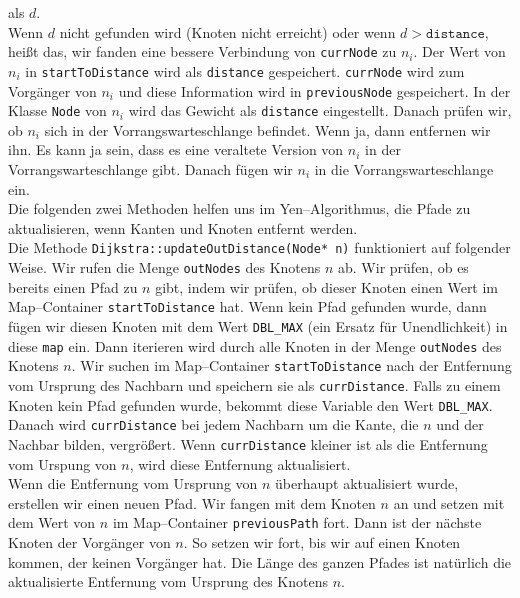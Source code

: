 \documentclass[a4paper,10pt,ngerman]{scrartcl}
\begin{document}
als $d$.\\
Wenn $d$ nicht gefunden wird (Knoten nicht erreicht) oder wenn $d > \texttt{distance}$, heißt das,
wir fanden eine bessere Verbindung von \texttt{currNode} zu $n_i$. Der Wert von $n_i$ in \texttt{startToDistance}
wird als \texttt{distance} gespeichert. \texttt{currNode} wird zum Vorgänger von $n_i$ und diese Information wird in
\texttt{previousNode} gespeichert. In der Klasse \texttt{Node} von $n_i$ wird das Gewicht als \texttt{distance} eingestellt.
Danach prüfen wir, ob $n_i$ sich in der Vorrangswarteschlange befindet. Wenn ja, dann entfernen wir ihn. Es kann ja sein,
dass es eine veraltete Version von $n_i$ in der Vorrangswarteschlange gibt.
Danach fügen wir $n_i$ in die Vorrangswarteschlange ein.\\

Die folgenden zwei Methoden helfen uns im Yen--Algorithmus,
die Pfade zu aktualisieren, wenn Kanten und Knoten entfernt werden.\\

Die Methode \texttt{Dijkstra::updateOutDistance(Node* n)} funktioniert auf folgender Weise.
Wir rufen die Menge \texttt{outNodes} des Knotens $n$ ab.
Wir prüfen, ob es bereits einen Pfad zu $n$ gibt, indem wir prüfen, ob dieser Knoten einen Wert im
Map--Container \texttt{startToDistance} hat.
Wenn kein Pfad gefunden wurde, dann fügen wir diesen Knoten mit dem Wert \texttt{DBL\_MAX} (ein Ersatz für Unendlichkeit)
in diese \texttt{map} ein.
Dann iterieren wird durch alle Knoten in der Menge \texttt{outNodes} des Knotens $n$. 
Wir suchen im Map--Container \texttt{startToDistance} nach der Entfernung vom Ursprung des Nachbarn und 
speichern sie als \texttt{currDistance}.
Falls zu einem Knoten kein Pfad gefunden wurde, bekommt diese Variable den Wert \texttt{DBL\_MAX}.
Danach wird \texttt{currDistance} bei jedem Nachbarn um die Kante, die $n$ und der Nachbar bilden, vergrößert.
Wenn \texttt{currDistance} kleiner ist als die Entfernung vom Urspung von $n$, 
wird diese Entfernung aktualisiert.\\
Wenn die Entfernung vom Ursprung von $n$ überhaupt aktualisiert wurde, 
erstellen wir einen neuen Pfad. Wir fangen mit dem Knoten $n$ an und setzen 
mit dem Wert von $n$ im Map--Container \texttt{previousPath} fort.
Dann ist der nächste Knoten der Vorgänger von $n$. So setzen wir fort, bis wir auf einen Knoten kommen,
der keinen Vorgänger hat. Die Länge des ganzen Pfades ist natürlich die aktualisierte Entfernung vom Ursprung
des Knotens $n$.\\
\end{document}
